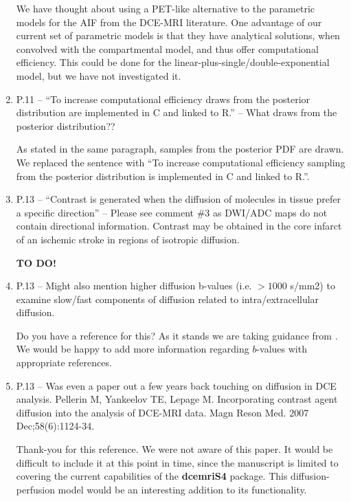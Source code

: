 \documentclass[11pt]{article}
\begin{document}
\begin{enumerate}
  We have thought about using a PET-like alternative to the parametric
  models for the AIF from the DCE-MRI literature.  One advantage of
  our current set of parametric models is that they have analytical
  solutions, when convolved with the compartmental model, and thus
  offer computational efficiency.  This could be done for the
  linear-plus-single/double-exponential model, but we have not
  investigated it.

\item P.11 – ``To increase computational efficiency draws from the
  posterior distribution are implemented in C and linked to R.'' –
  What draws from the posterior distribution??

  As stated in the same paragraph, samples from the posterior PDF are
  drawn.  We replaced the sentence with ``To increase computational
  efficiency sampling from the posterior distribution is implemented
  in \textsf{C} and linked to \textsf{R}.''.

\item P.13 – ``Contrast is generated when the diffusion of molecules
  in tissue prefer a specific direction'' – Please see comment \#3 as
  DWI/ADC maps do not contain directional information.  Contrast may
  be obtained in the core infarct of an ischemic stroke in regions of
  isotropic diffusion.

  \textbf{TO DO!}  

\item P.13 – Might also mention higher diffusion b-values
  (i.e. $>1000$ s/mm2) to examine slow/fast components of diffusion
  related to intra/extracellular diffusion.

  Do you have a reference for this?  As it stands we are taking
  guidance from \citet{pad-etal:neoplasia}.  We would be happy to add
  more information regarding $b$-values with appropriate references.

\item P.13 – Was even a paper out a few years back touching on
  diffusion in DCE analysis.  Pellerin M, Yankeelov TE, Lepage
  M. Incorporating contrast agent diffusion into the analysis of
  DCE-MRI data. Magn Reson Med. 2007 Dec;58(6):1124-34.

  Thank-you for this reference.  We were not aware of this paper.  It
  would be difficult to include it at this point in time, since the
  manuscript is limited to covering the current capabilities of the
  \textbf{dcemriS4} package.  This diffusion-perfusion model would be
  an interesting addition to its functionality.


\end{enumerate}
\end{document}
